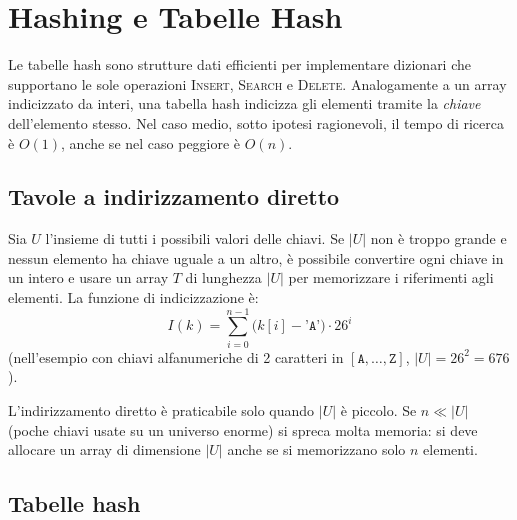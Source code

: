 \section{Hashing e Tabelle Hash}

\begin{softnote}
	Le tabelle hash sono strutture dati efficienti per implementare dizionari
	che supportano le sole operazioni \textsc{Insert}, \textsc{Search} e
	\textsc{Delete}. Analogamente a un array indicizzato da interi, una tabella
	hash indicizza gli elementi tramite la \emph{chiave} dell'elemento stesso.
	Nel caso medio, sotto ipotesi ragionevoli, il tempo di ricerca è $O(1)$,
	anche se nel caso peggiore è $O(n)$.
\end{softnote}

\subsection{Tavole a indirizzamento diretto}

\begin{definizione}
	Sia $U$ l'insieme di tutti i possibili valori delle chiavi. Se $|U|$ non è
	troppo grande e nessun elemento ha chiave uguale a un altro, è possibile
	convertire ogni chiave in un intero e usare un array $T$ di lunghezza $|U|$
	per memorizzare i riferimenti agli elementi. La funzione di indicizzazione è:
	\[
	I(k) = \sum_{i=0}^{n-1} \bigl(k[i] - \texttt{'A'}\bigr) \cdot 26^i
	\]
	(nell'esempio con chiavi alfanumeriche di 2 caratteri in
	$[\texttt{A},\ldots,\texttt{Z}]$, $|U| = 26^2 = 676$).
\end{definizione}

\begin{hardnote}
	L'indirizzamento diretto è praticabile solo quando $|U|$ è piccolo. Se
	$n \ll |U|$ (poche chiavi usate su un universo enorme) si spreca molta
	memoria: si deve allocare un array di dimensione $|U|$ anche se si
	memorizzano solo $n$ elementi.
\end{hardnote}

\subsection{Tabelle hash}


